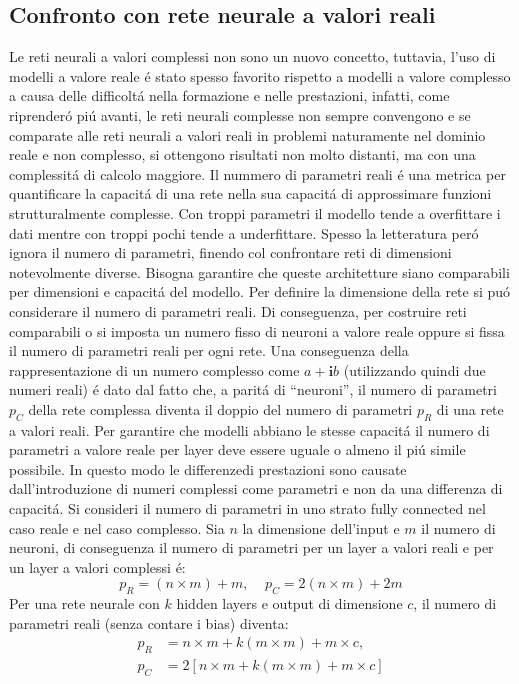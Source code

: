 \documentclass[a4paper,10pt]{article}
\begin{document}
 \subsection{Confronto con rete neurale a valori reali}
 
 Le reti neurali a valori complessi non sono un nuovo concetto, tuttavia, l'uso di modelli a valore reale \'e stato spesso favorito rispetto a modelli a valore complesso a causa delle difficolt\'a nella formazione e nelle prestazioni, infatti, come riprender\'o pi\'u avanti, le reti neurali complesse non sempre convengono e se comparate alle reti neurali a valori reali in problemi naturamente nel dominio reale e non complesso, si ottengono risultati non molto distanti, ma con una complessit\'a di calcolo maggiore. 
 Il nummero di parametri reali \'e una metrica per quantificare la capacit\'a di una rete nella sua capacit\'a di approssimare funzioni strutturalmente complesse. Con troppi parametri il modello tende a overfittare i dati mentre con troppi pochi tende a underfittare. Spesso la letteratura per\'o ignora il numero di parametri, finendo col confrontare reti di dimensioni notevolmente diverse.  Bisogna garantire che queste architetture siano comparabili per dimensioni e capacit\'a del modello. Per definire la dimensione della rete si pu\'o considerare il numero di parametri reali. Di conseguenza, per costruire reti comparabili o si imposta un numero fisso di neuroni a valore reale oppure si fissa il numero di parametri reali per ogni rete.
 Una conseguenza della rappresentazione di un numero complesso come $a+\textbf{i}b$ (utilizzando quindi due numeri reali) \'e dato dal fatto che, a parit\'a di ``neuroni'', il numero di parametri $p_C$ della rete complessa diventa il doppio del numero di parametri $p_R$ di una rete a valori reali. Per garantire che  modelli abbiano le stesse capacit\'a il numero di parametri a valore reale per layer deve essere uguale o almeno il pi\'u simile possibile. In questo modo le differenzedi prestazioni sono causate dall'introduzione di numeri complessi come parametri e non da una differenza di capacit\'a. 
 Si consideri il numero di parametri in uno strato fully connected nel caso reale e nel caso complesso. Sia $n$ la dimensione dell'input e $m$ il numero di neuroni, di conseguenza il numero di parametri per un layer a valori reali e per un layer a valori complessi \'e:
 \begin{equation}
  p_R = (n \times m) + m, \;\;\;\; p_C = 2(n \times m) + 2m
 \end{equation}
 Per una rete neurale con $k$ hidden layers e output di dimensione $c$, il numero di parametri reali (senza contare i bias) diventa:
 \begin{align}
  p_R &= n \times m + k(m \times m) + m \times c, \\
  p_C &= 2\left[ n \times m + k(m \times m) + m \times c \right]
 \end{align}
 
\end{document}
